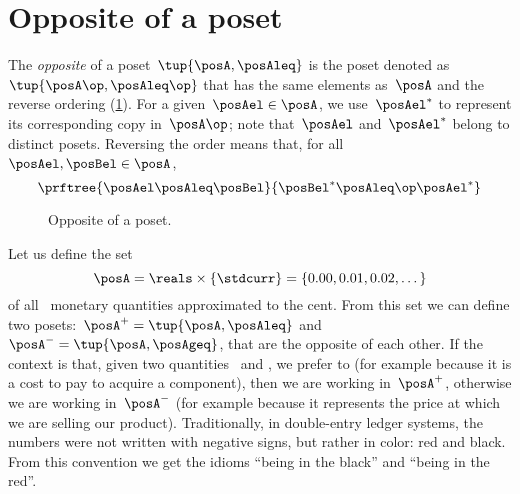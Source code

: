 \section{Opposite of a poset}\label{sec:opposite-of-a-poset}

\begin{definition}
  \label{def:poset-opposite}
  The \emph{opposite} of a poset~$\tup{\posA, \posAleq}$ is the poset denoted as~$\tup{\posA\op, \posAleq\op}$ that has the same elements as~$\posA$ and the reverse ordering (\cref{fig:poset-opposite}).
  For a given~$\posAel \in \posA$, we use~$\posAel^*$ to represent its corresponding copy in~$\posA\op$; note that~$\posAel$ and~$\posAel^*$ belong to distinct posets.
  Reversing the order means that, for all $\posAel,\posBel\in \posA$,
  \begin{equation}
    \prftree{\posAel \posAleq \posBel}{\posBel^* \posAleq\op \posAel^*}
  \end{equation}
\end{definition}

\begin{figure}[tbh]
  \centering
  \caption{Opposite of a poset.}
  \label{fig:poset-opposite}
\end{figure}

\begin{example}
  Let us define the set
  \begin{equation*}
    \posA=\reals \times \{\stdcurr\}=\{0.00,0.01,0.02,\dots\}
  \end{equation*}
  of all \stdcurr \ monetary quantities approximated to the cent.
  From this set we can define two posets:~$\posA^{+} = \tup{\posA, \posAleq}$ and~$\posA^{-} = \tup{\posA, \posAgeq}$, that are the opposite of each other.
  If the context is that, given two quantities~\unit[1]{\stdcurr} and \unit[2]{\stdcurr}, we prefer \unit[1]{\stdcurr} to \unit[2]{\stdcurr} (for example because it is a cost to pay to acquire a component), then we are working in~$\posA^{+}$, otherwise we are working in~$\posA^{-}$ (for example because it represents the price at which we are selling our product).
  Traditionally, in double-entry ledger systems, the numbers were not written with negative signs, but rather in color: red and black. From this convention we get the idioms ``being in the black'' and ``being in the red''.
\end{example}